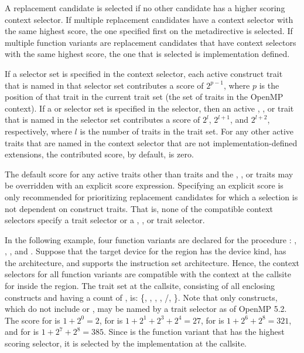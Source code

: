 A replacement candidate is selected if no other candidate has a higher scoring
context selector. If multiple replacement candidates have a context selector
with the same highest score, the one specified first on the metadirective is
selected. If multiple function variants are replacement candidates that have
context selectors with the same highest score, the one that is selected is
implementation defined.

If a  selector set is specified in the context selector, each
active construct trait that is named in that selector set contributes a score
of $2^{p-1}$, where $p$ is the position of that trait in the current
 trait set (the set of traits in the OpenMP context). If a
 or  selector set is specified in the
selector, then an active , , or  trait that is
named in the selector set contributes a score of $2^l$, $2^{l+1}$, and
$2^{l+2}$, respectively, where $l$ is the number of traits in the
 trait set. For any other active traits that are named in the
context selector that are not implementation-defined extensions, the
contributed score, by default, is zero. 

The default score for any active traits other than  traits and 
the , , or  traits may be overridden with an
explicit score expression. Specifying an explicit score is only recommended
for prioritizing replacement candidates for which a selection is not 
dependent on construct traits. That is, none of the compatible context
selectors specify a  trait selector or a ,
, or  trait selector. 

In the following example, four function variants are declared for the procedure
: , , , and . Suppose that
the target device for the  region has the  device kind,
has the  architecture, and supports the  instruction set
architecture. Hence, the context selectors for all function variants are
compatible with the context at the callsite for  inside the
 region. The  trait set at the callsite,
consisting of all enclosing constructs and having a count of , is:
\{, , , ,
/, \}. Note that only 
constructs, which do not include  or , may be
named by a  trait selector as of OpenMP 5.2. The score for
 is $1+2^0=2$, for  is $1+2^1+2^3+2^4=27$,
for  is $1+2^6+2^8=321$, and for  is $1+2^7+2^8=385$.
Since  is the function variant that has the highest scoring
selector, it is selected by the implementation at the callsite.

